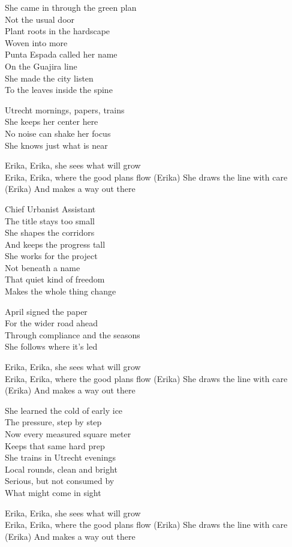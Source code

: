 \begin{lyrics}
She came in through the green plan\\
Not the usual door\\
Plant roots in the hardscape\\
Woven into more\\
Punta Espada called her name\\
On the Guajira line\\
She made the city listen\\
To the leaves inside the spine

Utrecht mornings, papers, trains\\
She keeps her center here\\
No noise can shake her focus\\
She knows just what is near

Erika, Erika, she sees what will grow\\
Erika, Erika, where the good plans flow
(Erika) She draws the line with care
(Erika) And makes a way out there

Chief Urbanist Assistant\\
The title stays too small\\
She shapes the corridors\\
And keeps the progress tall\\
She works for the project\\
Not beneath a name\\
That quiet kind of freedom\\
Makes the whole thing change

April signed the paper\\
For the wider road ahead\\
Through compliance and the seasons\\
She follows where it's led

Erika, Erika, she sees what will grow\\
Erika, Erika, where the good plans flow
(Erika) She draws the line with care
(Erika) And makes a way out there

She learned the cold of early ice\\
The pressure, step by step\\
Now every measured square meter\\
Keeps that same hard prep\\
She trains in Utrecht evenings\\
Local rounds, clean and bright\\
Serious, but not consumed by\\
What might come in sight

Erika, Erika, she sees what will grow\\
Erika, Erika, where the good plans flow
(Erika) She draws the line with care
(Erika) And makes a way out there
\end{lyrics}

